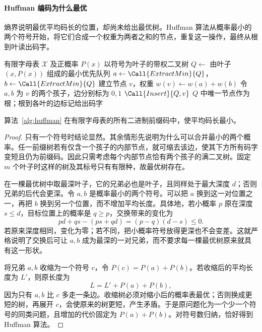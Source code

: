 \documentclass[lang=cn,a4paper,fontset=none,zihao=false,10pt,openany,twoside]{beautybook}
\numberwithin{algorithm}{chapter}
\begin{document}
\paragraph{Huffman 编码为什么最优}
熵界说明最优平均码长的位置，却尚未给出最优树。Huffman 算法从概率最小的两个符号开始，将它们合成一个权重为两者之和的节点，重复这一操作，最终从根到叶读出码字。
\begin{algorithm}[htbp]
\caption{构造 Huffman 前缀码}\label{alg:huffman}
\begin{algorithmic}[1]
\Require 有限字母表 $\mathcal X$ 及正概率 $P(x)$
\Ensure 以符号为叶子的带权二叉树
\State $Q\gets$ 由叶子 $(x,P(x))$ 组成的最小优先队列
 \State $a\gets\Call{ExtractMin}{Q}$，$b\gets\Call{ExtractMin}{Q}$
 \State 建立节点 $v$，权重 $w(v)\gets w(a)+w(b)$
 \State 令 $a,b$ 为 $v$ 的两个孩子，边分别标为 $0,1$
 \State $\Call{Insert}{Q,v}$
\EndWhile
\State \Return $Q$ 中唯一节点作为根；根到各叶的边标记给出码字
\end{algorithmic}
\end{algorithm}
\begin{theorem}\label{thm:huffman}
算法~\ref{alg:huffman} 在有限字母表的所有二进制前缀码中，使平均码长最小。
\end{theorem}
\begin{proof}
只有一个符号时结论显然。其余情形先说明为什么可以合并最小的两个概率。任一前缀树若有仅含一个孩子的内部节点，就可缩去该边，使其下方所有码字变短且仍为前缀码。因此只需考虑每个内部节点恰有两个孩子的满二叉树。固定 $m$ 个叶子时这样的树及其标号只有有限种，故最优树存在。

在一棵最优树中取最深叶子，它的兄弟必也是叶子，且同样处于最大深度 $d$；否则兄弟的后代会更深。令 $a,b$ 是概率最小的两个符号。可以把 $a$ 换到这一对位置之一，再把 $b$ 换到另一个位置，而不增加平均长度。具体地，若小概率 $p$ 原在深度 $s\le d$，目标位置上的概率是 $q\ge p$，交换带来的变化为
\[
 pd+qs-(ps+qd)=(p-q)(d-s)\le0.
\]
若原来深度相同，变化为零；若不同，把小概率符号放得更深也不会变差。这就严格说明了交换后可让 $a,b$ 成为最深的一对兄弟，而不要求每一棵最优树原来就具有这一形状。

将兄弟 $a,b$ 收缩为一个符号 $c$，令 $P(c)=P(a)+P(b)$。若收缩后的平均长度为 $L'$，则原长度为
\[
 L=L'+P(a)+P(b),
\]
因为只有 $a,b$ 比 $c$ 多走一条边。收缩树必须对缩小后的概率表最优；否则换成更短的树，再展开 $c$，会使原来的树更短，产生矛盾。于是原问题化为一个少一个符号的同类问题，且增加的代价固定为 $P(a)+P(b)$。对符号数归纳，恰好得到 Huffman 算法。
\end{proof}
\end{document}
